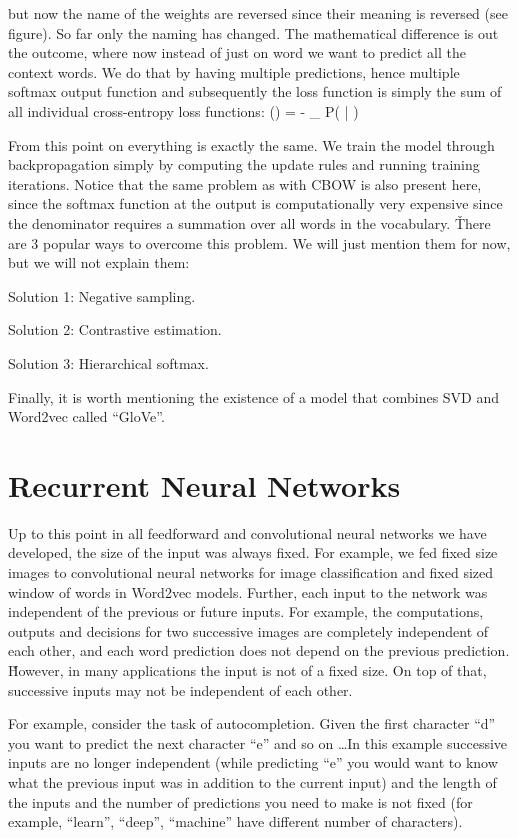 but now the name of the weights are reversed since their meaning is reversed (see figure). So far only the naming has
changed. The mathematical difference is out the outcome, where now instead of just on word we want to predict all the
context words. We do that by having multiple predictions, hence multiple softmax output function and subsequently the
loss function is simply the sum of all individual cross-entropy loss functions:
\bse
{}(\theta) = - \sum_{} \ln P( | )
\ese

From this point on everything is exactly the same. We train the model through backpropagation simply by computing the
update rules and running training iterations. Notice that the same problem as with CBOW is also present here, since
the softmax function at the output is computationally very expensive since the denominator requires a summation over
all words in the vocabulary. \v

There are 3 popular ways to overcome this problem. We will just mention them for now, but we will not explain them:
\bit
\item Solution 1: Negative sampling.
\item Solution 2: Contrastive estimation.
\item Solution 3: Hierarchical softmax.
\eit

Finally, it is worth mentioning the existence of a model that combines SVD and Word2vec called ``GloVe''.

\section{Recurrent Neural Networks}

Up to this point in all feedforward and convolutional neural networks we have developed, the size of the input was
always fixed. For example, we fed fixed size images to convolutional neural networks for image classification and
fixed sized window of words in Word2vec models. Further, each input to the network was independent of the previous or
future inputs. For example, the computations, outputs and decisions for two successive images are completely
independent of each other, and each word prediction does not depend on the previous prediction. \v

However, in many applications the input is not of a fixed size. On top of that, successive inputs may not be
independent of each other.

\be
For example, consider the task of autocompletion. Given the first character ``d'' you want to predict the next
character ``e'' and so on \ldots In this example successive inputs are no longer independent (while predicting ``e''
you would want to know what the previous input was in addition to the current input) and the length of the inputs and
the number of predictions you need to make is not fixed (for example, ``learn'', ``deep'', ``machine'' have different
number of characters).


